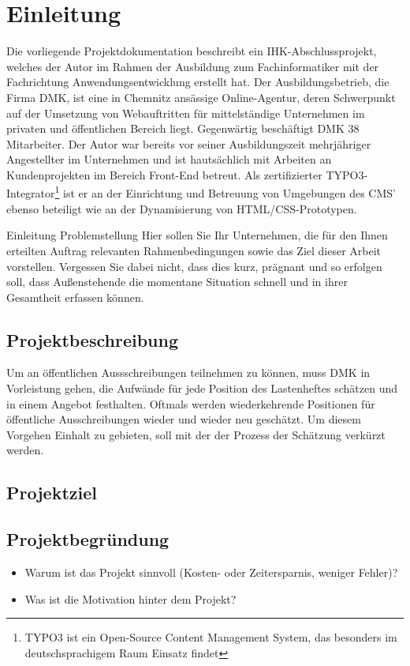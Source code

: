 \section{Einleitung}
\label{sec:Einleitung}
Die vorliegende Projektdokumentation beschreibt ein IHK-Abschlussprojekt,
welches der Autor im Rahmen der Ausbildung zum Fachinformatiker mit der
Fachrichtung Anwendungsentwicklung erstellt hat. Der Ausbildungsbetrieb, die
Firma \ac{DMK}, ist eine in Chemnitz ansässige Online-Agentur, deren Schwerpunkt
auf der Umsetzung von Webauftritten für mittelständige Unternehmen im privaten
und öffentlichen Bereich liegt. Gegenwärtig beschäftigt \acs{DMK} 38
Mitarbeiter. Der Autor war bereits vor seiner Ausbildungszeit
mehrjähriger Angestellter im Unternehmen und ist hautsächlich mit Arbeiten an
Kundenprojekten im Bereich Front-End betreut. Als zertifizierter
TYPO3-Integrator\footnote{TYPO3 ist ein Open-Source Content Management System,
das besonders im deutschsprachigem Raum Einsatz findet} ist er an der
Einrichtung und Betreuung von Umgebungen des \acs{CMS}' ebenso beteiligt wie an
der Dynamisierung von \acs{HTML}/\acs{CSS}-Prototypen.


Einleitung Problemstellung
Hier sollen Sie Ihr Unternehmen, die für den Ihnen erteilten Auftrag
relevanten Rahmenbedingungen sowie das Ziel dieser Arbeit vorstellen.
Vergessen Sie dabei nicht, dass dies kurz, prägnant und so
erfolgen soll, dass Außenstehende die momentane Situation schnell
und in ihrer Gesamtheit erfassen können.

\subsection{Projektbeschreibung} 
\label{sec:Projektbeschreibung}
Um an öffentlichen Aussschreibungen teilnehmen zu können, muss
\acs{DMK} in Vorleistung gehen, die Aufwände für jede Position des Lastenheftes
schätzen und in einem Angebot festhalten.
Oftmals werden wiederkehrende Positionen für öffentliche Ausschreibungen wieder
und wieder neu geschätzt. Um diesem Vorgehen Einhalt zu gebieten, soll mit der
{\titel} der Prozess der Schätzung verkürzt werden.

\subsection{Projektziel} 
\label{sec:Projektziel}


\subsection{Projektbegründung} 
\label{sec:Projektbegruendung}
\begin{itemize}
	\item Warum ist das Projekt sinnvoll (\zB Kosten- oder Zeitersparnis, weniger Fehler)?
	\item Was ist die Motivation hinter dem Projekt?
\end{itemize}


